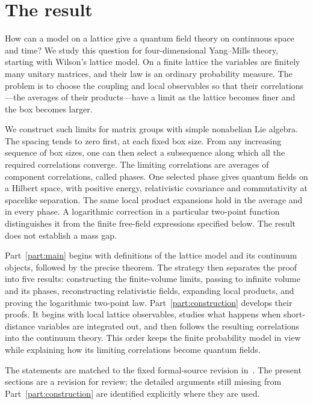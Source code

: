 \section{The result}\label{sec:result}

How can a model on a lattice give a quantum field theory on continuous space and time?
We study this question for four-dimensional Yang--Mills theory, starting with Wilson's lattice model.
On a finite lattice the variables are finitely many unitary matrices, and their law is an ordinary probability measure.
The problem is to choose the coupling and local observables so that their correlations---the averages of their products---have a limit as the lattice becomes finer and the box becomes larger.

We construct such limits for matrix groups with simple nonabelian Lie algebra.
The spacing tends to zero first, at each fixed box size.
From any increasing sequence of box sizes, one can then select a subsequence along which all the required correlations converge.
The limiting correlations are averages of component correlations, called phases.
One selected phase gives quantum fields on a Hilbert space, with positive energy, relativistic covariance and commutativity at spacelike separation.
The same local product expansions hold in the average and in every phase.
A logarithmic correction in a particular two-point function distinguishes it from the finite free-field expressions specified below.
The result does not establish a mass gap.

Part~\ref{part:main} begins with definitions of the lattice model and its continuum objects, followed by the precise theorem.
The strategy then separates the proof into five results: constructing the finite-volume limits, passing to infinite volume and its phases, reconstructing relativistic fields, expanding local products, and proving the logarithmic two-point law.
Part~\ref{part:construction} develops their proofs.
It begins with local lattice observables, studies what happens when short-distance variables are integrated out, and then follows the resulting correlations into the continuum theory.
This order keeps the finite probability model in view while explaining how its limiting correlations become quantum fields.

The statements are matched to the fixed formal-source revision in~\cite{OpenAIYM}.
The present sections are a revision for review; the detailed arguments still missing from Part~\ref{part:construction} are identified explicitly where they are used.
